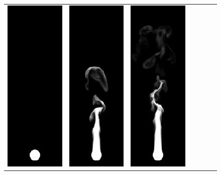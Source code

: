 \documentclass[accepted,single]{gipaper}
\begin{document}
\begin{figure}
  \begin{center}
    \begin{tabular}{ccccccc}
      \includegraphics[width=0.12\linewidth]{Eulernovort1000cubic/0.jpg} & \includegraphics[width=0.12\linewidth]{Eulernovort1000cubic/6.jpg} & \includegraphics[width=0.12\linewidth]{Eulernovort1000cubic/10.jpg} & 

\end{tabular}
\end{center}
\end{figure}
\end{document}
